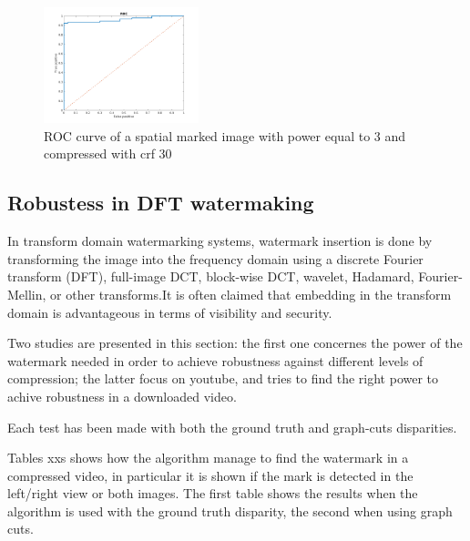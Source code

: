 \begin{figure}[h!]
\centering
\includegraphics[width=0.4\textwidth]{./img/ROC/ROC_gauss_3_30.png}
\caption{\small{ROC curve of a spatial marked image with power equal to 3 and compressed with crf 30 }}
\label{fig:g3crf30}
\end{figure}

\subsection{Robustess in DFT watermaking}

In transform domain watermarking systems, watermark insertion is done by transforming the image into the frequency domain using a discrete Fourier transform (DFT), full-image DCT, block-wise DCT, wavelet, Hadamard, Fourier-Mellin, or other transforms.\newline  It is often claimed that embedding in the transform domain is advantageous in terms of visibility and security.\newline 

Two studies are presented in this section: the first one concernes the power of the watermark needed in order to achieve robustness against different levels of compression; the latter focus on youtube, and tries to find the right power to achive robustness in a downloaded video.\newline 

Each test has been made with both the ground truth and graph-cuts disparities.\newline 

Tables xxs shows how the algorithm manage to find the watermark in a compressed video, in particular it is shown if the mark is detected in the left/right view or both images. The first table shows the results when the algorithm is used with the ground truth disparity, the second when using graph cuts.


